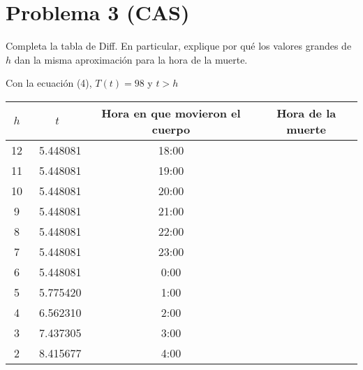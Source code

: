 \section*{Problema 3 (CAS)}
Completa la tabla de Diff. En particular, explique por qué los valores grandes de $h$ dan la misma aproximación para la hora de la muerte.

\begin{center}
    Con la ecuación (4), $T(t) = 98$ y $t > h$\\ 
    \vspace{10pt}
    \begin{tabular}{ |c|c|c|c| } 
        \hline
        $h$ & $t$ & Hora en que movieron el cuerpo & Hora de la muerte \\ 
        \hline
        12 & ~5.448081 & 18:00 &\\
        \hline
        11 & ~5.448081 & 19:00 &\\
        \hline
        10 & ~5.448081 & 20:00 &\\
        \hline
        9 & ~5.448081 & 21:00 &\\
        \hline
        8 & ~5.448081 & 22:00 &\\
        \hline
        7 & ~5.448081 & 23:00 &\\
        \hline
        6 & ~5.448081 & 0:00 &\\
        \hline
        5 & ~5.775420 & 1:00 &\\
        \hline
        4 & ~6.562310 & 2:00 &\\
        \hline
        3 & ~7.437305 & 3:00 &\\
        \hline
        2 & ~8.415677 & 4:00 &\\
        \hline
    \end{tabular}
\end{center}